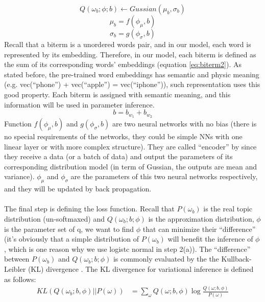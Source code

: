 \begin{equation}
    Q(\omega_b;\phi;b) \leftarrow Gussian(\mu_b,\sigma_b)
\label{eq:var1}
\end{equation}
\begin{equation}
    \mu_b = f(\phi_{\mu}, b)
\label{eq:var2}
\end{equation}
\begin{equation}
    \sigma_b = g(\phi_{\sigma}, b)
\label{eq:var3}
\end{equation}
Recall that a biterm is a unordered words pair, and in our model, each word is represented by its embedding. Therefore, in our model, each biterm is defined as the sum of its corresponding words' embeddings (equation \ref{eq:biterm2}). As stated before, the pre-trained word embeddings has semantic and physic meaning (e.g. vec(``phone'') + vec(``apple'') = vec(``iphone'')), such representation uses this good property. Each biterm is assigned with semantic meaning, and this information will be used in parameter inference.
\begin{equation}
    b = b_{w_1} + b_{w_2}
\label{eq:biterm2}
\end{equation}
Function $f(\phi_{\mu}, b)$ and $g(\phi_{\sigma}, b)$ are two neural networks with no bias (there is no special requirements of the networks, they could be simple NNs with one linear layer or with more complex structure). They are called ``encoder'' by \cite{kingma2013auto} since they receive a data (or a batch of data) and output the parameters of its corresponding distribution model (in term of Gussian, the outputs are mean and variance). $\phi_{\mu}$ and $\phi_{\sigma}$ are the parameters of this two neural networks respectively, and they will be updated by back propagation.\\\\
The final step is defining the loss function. Recall that $P(\omega_b)$ is the real topic distribution (un-softmaxed) and $Q(\omega_b;b;\phi)$ is the approximation distribution, $\phi$ is the parameter set of q, we want to find $\phi$ that can minimize their ``difference'' (it's obviously that a simple distribution of $P(\omega_b)$ will benefit the inference of $\phi$, which is one reason why we use logistc normal in step 2(a)). The ``difference'' between $P(\omega_b)$ and $Q(\omega_b;b;\phi)$ is commonly evaluated by the  the Kullback-Leibler (KL) divergence \cite{yang2017understanding}. The KL divergence for variational inference is defined as follows: 
\begin{equation}
    \begin{aligned}
        KL(Q(\omega_b;b,\phi)||P(\omega)) & = \sum_{\omega}Q(\omega;b,\phi)\log\frac{Q(\omega;b,\phi)}{P(\omega)}\\
    \end{aligned} 
    \label{eq:KL}
\end{equation}
